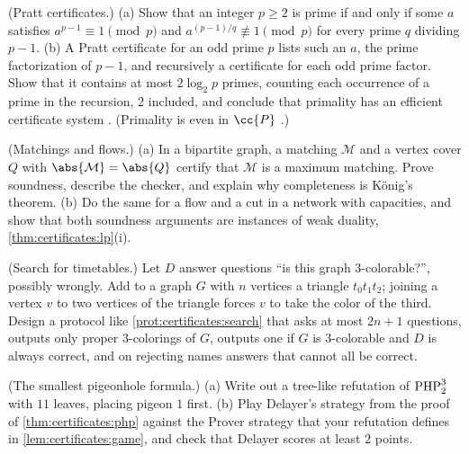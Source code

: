 \begin{refsection}
\begin{exercises}
\item \consolidation (Pratt certificates.) (a) Show that an integer $p\ge2$ is prime if and only if some $a$ satisfies $a^{p-1}\equiv1\pmod p$ and $a^{(p-1)/q}\not\equiv1\pmod p$ for every prime $q$ dividing $p-1$. (b) A Pratt certificate for an odd prime $p$ lists such an $a$, the prime factorization of $p-1$, and recursively a certificate for each odd prime factor. Show that it contains at most $2\log_2p$ primes, counting each occurrence of a prime in the recursion, $2$ included, and conclude that primality has an efficient certificate system \parencite{Pratt1975}. (Primality is even in $\cc{P}$ \parencite{AgrawalKayalSaxena2004}.) \label{ex:certificates:pratt}

\item \consolidation (Matchings and flows.) (a) In a bipartite graph, a matching $\mathcal{M}$ and a vertex cover $Q$ with $\abs{\mathcal{M}}=\abs{Q}$ certify that $\mathcal{M}$ is a maximum matching. Prove soundness, describe the checker, and explain why completeness is König's theorem. (b) Do the same for a flow and a cut in a network with capacities, and show that both soundness arguments are instances of weak duality, \cref{thm:certificates:lp}(i).\label{ex:certificates:konig}

\item \consolidation (Search for timetables.) Let $D$ answer questions ``is this graph $3$-colorable?'', possibly wrongly. Add to a graph $G$ with $n$ vertices a triangle $t_0t_1t_2$; joining a vertex $v$ to two vertices of the triangle forces $v$ to take the color of the third. Design a protocol like \cref{prot:certificates:search} that asks at most $2n+1$ questions, outputs only proper $3$-colorings of $G$, outputs one if $G$ is $3$-colorable and $D$ is always correct, and on rejecting names answers that cannot all be correct.\label{ex:certificates:coloring}

\item \consolidation (The smallest pigeonhole formula.) (a) Write out a tree-like refutation of $\mathrm{PHP}^{3}_{2}$ with $11$ leaves, placing pigeon $1$ first. (b) Play Delayer's strategy from the proof of \cref{thm:certificates:php} against the Prover strategy that your refutation defines in \cref{lem:certificates:game}, and check that Delayer scores at least $2$ points.\label{ex:certificates:php32}


\end{exercises}
\end{refsection}
